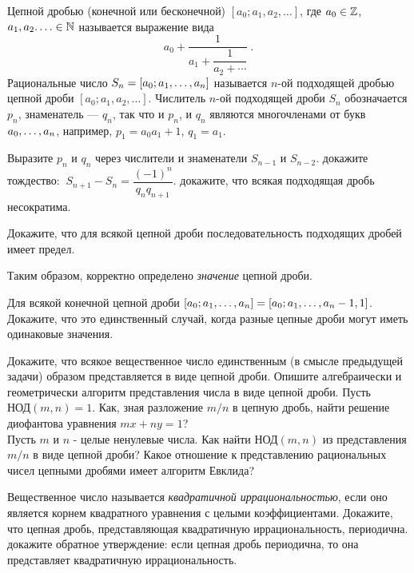 \documentclass[a4paper,12pt]{article}
\begin{document}

    Цепной дробью (конечной или бесконечной) $[a_0;a_1,a_2,\ldots]$, где   $a_0\in\mathbb{Z}$, $a_1,a_2.\ldots\in\mathbb{N}$ называется выражение вида   $$a_0+\dfrac{1}{a_1+\dfrac{1}{a_2+\cdots}}\ .$$
   Рациональные число $S_n=[a_0;a_1,\ldots, a_n]$ называется $n$-ой подходящей дробью цепной дроби   $[a_0;a_1,a_2,\ldots]$. Числитель $n$-ой подходящей дроби $S_n$ обозначается $p_n$, знаменатель --- $q_n$, так что и $p_n$, и $q_n$ являются многочленами от букв $a_0,\ldots, a_n$, например, $p_1=a_0a_1+1$, $q_1=a_1$.



    Выразите $p_n$ и $q_n$ через числители и знаменатели $S_{n-1}$ и $S_{n-2}$.
   докажите тождество: $\ S_{n+1}-S_n=\dfrac{(-1)^n}{q_nq_{n+1}}$.
   докажите, что всякая подходящая дробь несократима.


   Докажите, что для всякой цепной дроби последовательность подходящих дробей имеет предел.

Таким образом, корректно определено {\it значение} цепной дроби.


   Для всякой конечной цепной дроби $[a_0;a_1,\ldots, a_n]=[a_0;a_1,\ldots, a_n-1,1]$.   Докажите, что это единственный случай, когда разные цепные дроби могут иметь одинаковые значения.


   Докажите, что всякое вещественное число единственным (в смысле предыдущей задачи) образом   представляется в виде цепной дроби. Опишите алгебраически и геометрически   алгоритм представления числа в виде цепной дроби.
    Пусть $\text{НОД}(m,n)=1$. Как, зная разложение $m/n$ в цепную дробь, найти   решение диофантова уравнения $mx+ny=1$?\\
    Пусть $m$ и $n$ - целые ненулевые числа. Как найти $\text{НОД}(m,n)$ из представления  $m/n$ в виде цепной дроби? Какое отношение к представлению рациональных чисел цепными дробями   имеет алгоритм Евклида?


    Вещественное число называется {\it квадратичной иррациональностью}, если оно является корнем квадратного уравнения с целыми коэффициентами. Докажите, что цепная дробь,   представляющая квадратичную иррациональность, периодична.\\
    докажите обратное утверждение: если цепная дробь периодична, то она   представляет квадратичную иррациональность.
\end{document}
